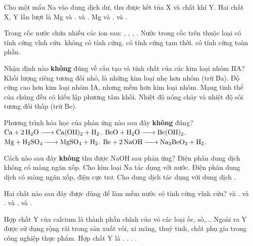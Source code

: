 \documentclass[11pt,a4paper]{article}
\def\loigiai#1{}
\begin{document}
\begin{ex}
Cho một mẩu Na vào dung dịch  dư, thu được kết tủa X và chất khí Y. Hai chất X, Y lần lượt là
\choice
{Mg và .}
{ và .}
{Mg và .}
{ và .}
\loigiai{}
\end{ex}

\begin{ex}
Trong cốc nước chứa nhiều các ion sau: , , , . Nước trong cốc trên thuộc loại
\choice
{có tính cứng vĩnh cửu.}
{không có tính cứng.}
{có tính cứng tạm thời.}
{có tính cứng toàn phần.}
\loigiai{}
\end{ex}

\begin{ex}
Nhận định nào \textbf{không} đúng về cấu tạo và tính chất của các kim loại nhóm IIA?
\choice
{Khối lượng riêng tương đối nhỏ, là những kim loại nhẹ hơn nhôm (trừ Ba).}
{Độ cứng cao hơn kim loại nhóm IA, nhưng mềm hơn kim loại nhôm.}
{Mạng tinh thể của chúng đều có kiểu lập phương tâm khối.}
{Nhiệt độ nóng chảy và nhiệt độ sôi tương đối thấp (trừ Be).}
\loigiai{}
\end{ex}

\begin{ex}
Phương trình hóa học của phản ứng nào sau đây \textbf{không} đúng?
\choice
{$\ce{Ca + 2H2O -> Ca(OH)2 + H2}$.}
{$\ce{BeO + H2O -> Be(OH)2}$.}
{$\ce{Mg + H2SO4 -> MgSO4 + H2}$.}
{$\ce{Be + 2NaOH -> Na2BeO2 + H2}$.}
\loigiai{}
\end{ex}

\begin{ex}
Cách nào sau đây \textbf{không} thu được NaOH sau phản ứng?
\choice
{Điện phân dung dịch  không có màng ngăn xốp.}
{Cho kim loại Na tác dụng với nước.}
{Điện phân dung dịch  có màng ngăn xốp, điện cực trơ.}
{Cho dung dịch  tác dụng với dung dịch .}
\loigiai{}
\end{ex}

\begin{ex}
Hai chất nào sau đây được dùng để làm mềm nước có tính cứng vĩnh cửu?
\choice
{ và .}
{ và .}
{ và .}
{ và .}
\loigiai{}
\end{ex}

\newpage

\begin{ex}
Hợp chất Y của calcium là thành phần chính của vỏ các loại ốc, sò,... Ngoài ra Y được sử dụng rộng rãi trong sản xuất vôi, xi măng, thuỷ tinh, chất phụ gia trong công nghiệp thực phẩm. Hợp chất Y là
\choice
{.}
{.}
{.}
{.}
\loigiai{}
\end{ex}
\end{document}

